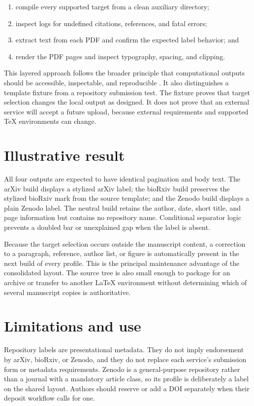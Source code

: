 \documentclass[times,twoside]{_Templates/MultiTargetManuscript}
\begin{document}
\begin{enumerate}
  \item compile every supported target from a clean auxiliary directory;
  \item inspect logs for undefined citations, references, and fatal errors;
  \item extract text from each PDF and confirm the expected label behavior; and
  \item render the PDF pages and inspect typography, spacing, and clipping.
\end{enumerate}

This layered approach follows the broader principle that computational outputs
should be accessible, inspectable, and reproducible \cite{mesirov2010accessible}.
It also distinguishes a template fixture from a repository submission test. The
fixture proves that target selection changes the local output as designed. It
does not prove that an external service will accept a future upload, because
external requirements and supported TeX environments can change.

\section*{Illustrative result}

All four outputs are expected to have identical pagination and body text. The
arXiv build displays a stylized arXiv label; the bioRxiv build preserves the
stylized bioRxiv mark from the source template; and the Zenodo build displays a
plain Zenodo label. The neutral build retains the author, date, short title, and
page information but contains no repository name. Conditional separator logic
prevents a doubled bar or unexplained gap when the label is absent.

Because the target selection occurs outside the manuscript content, a correction
to a paragraph, reference, author list, or figure is automatically present in the
next build of every profile. This is the principal maintenance advantage of the
consolidated layout. The source tree is also small enough to package for an
archive or transfer to another LaTeX environment without determining which of
several manuscript copies is authoritative.

\section*{Limitations and use}

Repository labels are presentational metadata. They do not imply endorsement by
arXiv, bioRxiv, or Zenodo, and they do not replace each service's submission form
or metadata requirements. Zenodo is a general-purpose repository rather than a
journal with a mandatory article class, so its profile is deliberately a label
on the shared layout. Authors should reserve or add a DOI separately when their
deposit workflow calls for one.
\end{document}
